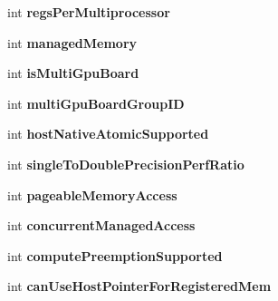 \begin{DoxyCompactItemize}
\item 
int {\bfseries regs\+Per\+Multiprocessor}\hypertarget{structcudaDeviceProp_ade02e669caefcadadaaa42877b08e80a}{}\label{structcudaDeviceProp_ade02e669caefcadadaaa42877b08e80a}

\item 
int {\bfseries managed\+Memory}\hypertarget{structcudaDeviceProp_af7230860be3e37047c7ce5d32542b54b}{}\label{structcudaDeviceProp_af7230860be3e37047c7ce5d32542b54b}

\item 
int {\bfseries is\+Multi\+Gpu\+Board}\hypertarget{structcudaDeviceProp_a512d849f57e6a6a0ece1d21879c3ae35}{}\label{structcudaDeviceProp_a512d849f57e6a6a0ece1d21879c3ae35}

\item 
int {\bfseries multi\+Gpu\+Board\+Group\+ID}\hypertarget{structcudaDeviceProp_a63af976611c9d29f169882f5c32472d4}{}\label{structcudaDeviceProp_a63af976611c9d29f169882f5c32472d4}

\item 
int {\bfseries host\+Native\+Atomic\+Supported}\hypertarget{structcudaDeviceProp_aef82fd7d1d0413c7d6f33287e5b6306f}{}\label{structcudaDeviceProp_aef82fd7d1d0413c7d6f33287e5b6306f}

\item 
int {\bfseries single\+To\+Double\+Precision\+Perf\+Ratio}\hypertarget{structcudaDeviceProp_a4bd4d531bf2ac497d659b03910440315}{}\label{structcudaDeviceProp_a4bd4d531bf2ac497d659b03910440315}

\item 
int {\bfseries pageable\+Memory\+Access}\hypertarget{structcudaDeviceProp_a46116bab1064b5d7d0642d78f6c27ce1}{}\label{structcudaDeviceProp_a46116bab1064b5d7d0642d78f6c27ce1}

\item 
int {\bfseries concurrent\+Managed\+Access}\hypertarget{structcudaDeviceProp_a16f9619ccc85e93bc456b8c69c80e78b}{}\label{structcudaDeviceProp_a16f9619ccc85e93bc456b8c69c80e78b}

\item 
int {\bfseries compute\+Preemption\+Supported}\hypertarget{structcudaDeviceProp_a54a9a6e0067360f23dc91e60e7cf88d1}{}\label{structcudaDeviceProp_a54a9a6e0067360f23dc91e60e7cf88d1}

\item 
int {\bfseries can\+Use\+Host\+Pointer\+For\+Registered\+Mem}\hypertarget{structcudaDeviceProp_aae79e062f076b0270625b38bb91285b8}{}\label{structcudaDeviceProp_aae79e062f076b0270625b38bb91285b8}


\end{DoxyCompactItemize}
